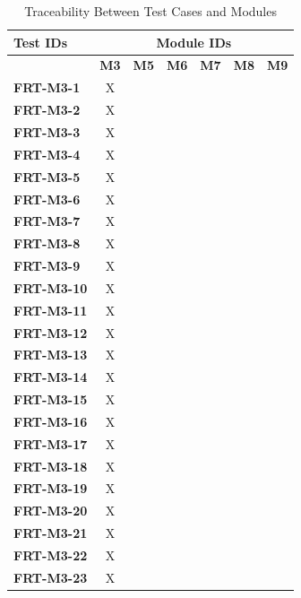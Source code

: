 \documentclass[12pt, titlepage]{article}
\begin{document}
\begin{longtable}{|l|cccccc|}
	\caption{Traceability Between Test Cases and Modules}                                                                                             \\
	\hline
	\textbf{Test IDs}  & \multicolumn{6}{c|}{\textbf{Module IDs}}                                                                                     \\
	\hline
  ~ & \textbf{M3} & \textbf{M5} & \textbf{M6} & \textbf{M7} & \textbf{M8} & \textbf{M9} \\
	\hline
  \textbf{FRT-M3-1} & X & ~ & ~ & ~ & ~ & ~ \\
  \textbf{FRT-M3-2} & X & ~ & ~ & ~ & ~ & ~ \\
  \textbf{FRT-M3-3} & X & ~ & ~ & ~ & ~ & ~ \\
  \textbf{FRT-M3-4} & X & ~ & ~ & ~ & ~ & ~ \\
  \textbf{FRT-M3-5} & X & ~ & ~ & ~ & ~ & ~ \\
  \textbf{FRT-M3-6} & X & ~ & ~ & ~ & ~ & ~ \\
  \textbf{FRT-M3-7} & X & ~ & ~ & ~ & ~ & ~ \\
  \textbf{FRT-M3-8} & X & ~ & ~ & ~ & ~ & ~ \\
  \textbf{FRT-M3-9} & X & ~ & ~ & ~ & ~ & ~ \\
  \textbf{FRT-M3-10} & X & ~ & ~ & ~ & ~ & ~ \\
  \textbf{FRT-M3-11} & X & ~ & ~ & ~ & ~ & ~ \\
  \textbf{FRT-M3-12} & X & ~ & ~ & ~ & ~ & ~ \\
  \textbf{FRT-M3-13} & X & ~ & ~ & ~ & ~ & ~ \\
  \textbf{FRT-M3-14} & X & ~ & ~ & ~ & ~ & ~ \\
  \textbf{FRT-M3-15} & X & ~ & ~ & ~ & ~ & ~ \\
  \textbf{FRT-M3-16} & X & ~ & ~ & ~ & ~ & ~ \\
  \textbf{FRT-M3-17} & X & ~ & ~ & ~ & ~ & ~ \\
  \textbf{FRT-M3-18} & X & ~ & ~ & ~ & ~ & ~ \\
  \textbf{FRT-M3-19} & X & ~ & ~ & ~ & ~ & ~ \\
  \textbf{FRT-M3-20} & X & ~ & ~ & ~ & ~ & ~ \\
  \textbf{FRT-M3-21} & X & ~ & ~ & ~ & ~ & ~ \\
  \textbf{FRT-M3-22} & X & ~ & ~ & ~ & ~ & ~ \\
  \textbf{FRT-M3-23} & X & ~ & ~ & ~ & ~ & ~ \\

\end{longtable}
\end{document}
